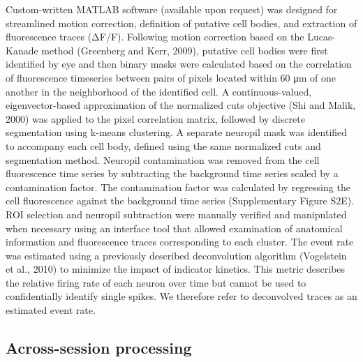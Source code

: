 Custom-written MATLAB software (available upon request) was designed for streamlined motion correction, definition of putative cell bodies, and extraction of fluorescence traces (ΔF/F). Following motion correction based on the Lucas-Kanade method (Greenberg and Kerr, 2009), putative cell bodies were first identified by eye and then binary masks were calculated based on the correlation of fluorescence timeseries between pairs of pixels located within 60 μm of one another in the neighborhood of the identified cell. A continuous-valued, eigenvector-based approximation of the normalized cuts objective (Shi and Malik, 2000) was applied to the pixel correlation matrix, followed by discrete segmentation using k-means clustering. A separate neuropil mask was identified to accompany each cell body, defined using the same normalized cuts and segmentation method. Neuropil contamination was removed from the cell fluorescence time series by subtracting the background time series scaled by a contamination factor. The contamination factor was calculated by regressing the cell fluorescence against the background time series (Supplementary Figure S2E). ROI selection and neuropil subtraction were manually verified and manipulated when necessary using an interface tool that allowed examination of anatomical information and fluorescence traces corresponding to each cluster. The event rate was estimated using a previously described deconvolution algorithm (Vogelstein et al., 2010) to minimize the impact of indicator kinetics. This metric describes the relative firing rate of each neuron over time but cannot be used to confidentially identify single spikes. We therefore refer to deconvolved traces as an estimated event rate.

 \subsection{Across-session processing} \label{methods:across_session_process}

